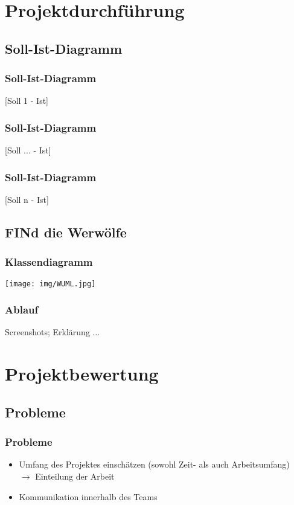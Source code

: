 \documentclass{beamer}
\begin{document}
	
\section{Projektdurchführung}

	\subsection{Soll-Ist-Diagramm}
\begin{frame}
\frametitle{Soll-Ist-Diagramm}

[Soll 1 - Ist]

\end{frame}

\begin{frame}
\frametitle{Soll-Ist-Diagramm}

[Soll ... - Ist]

\end{frame}

\begin{frame}
\frametitle{Soll-Ist-Diagramm}

[Soll n - Ist]

\end{frame}

	
	\subsection{FINd die Werwölfe}
\begin{frame}
\frametitle{Klassendiagramm}
\texttt{[image: img/WUML.jpg]}
\end{frame}

\begin{frame}
\frametitle{Ablauf}
Screenshots; Erklärung ...
\end{frame}


\section{Projektbewertung}


	\subsection{Probleme}
\begin{frame}
\frametitle{Probleme}
\begin{itemize}
\item Umfang des Projektes einschätzen (sowohl Zeit- als auch Arbeitsumfang)
\\ $\rightarrow$ Einteilung der Arbeit
\pause
\item Kommunikation innerhalb des Teams
\end{itemize}
\end{frame}
	
\end{document}
